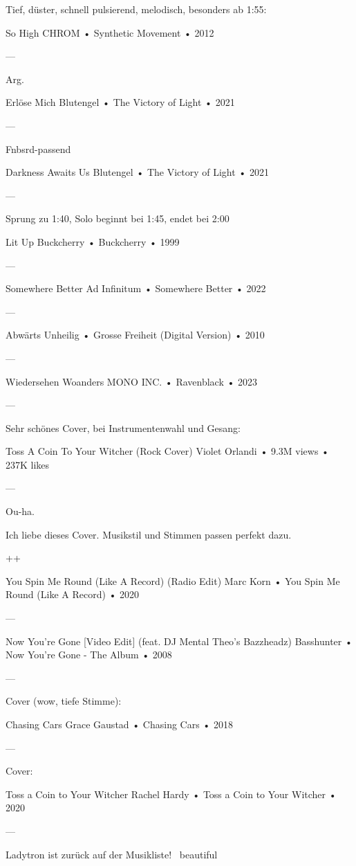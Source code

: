 Tief, düster, schnell pulsierend, melodisch, besonders ab 1:55:

So High
CHROM
 •
Synthetic Movement
 •
2012

—

Arg.

Erlöse Mich
Blutengel
 •
The Victory of Light
 •
2021


—

Fnbsrd-passend

Darkness Awaits Us
Blutengel
 •
The Victory of Light
 •
2021


—

Sprung zu 1:40, Solo beginnt bei 1:45, endet bei 2:00

Lit Up
Buckcherry
 •
Buckcherry
 •
1999



—

Somewhere Better
Ad Infinitum
 •
Somewhere Better
 •
2022


—

Abwärts
Unheilig
 •
Grosse Freiheit (Digital Version)
 •
2010

—

Wiedersehen Woanders
MONO INC.
 •
Ravenblack
 •
2023

—

Sehr schönes Cover, bei Instrumentenwahl und Gesang:

Toss A Coin To Your Witcher (Rock Cover)
Violet Orlandi
 •
9.3M views
 •
237K likes

—

Ou-ha.

Ich liebe dieses Cover. Musikstil und Stimmen passen perfekt dazu.

++

You Spin Me Round (Like A Record) (Radio Edit)
Marc Korn
 •
You Spin Me Round (Like A Record)
 •
2020

—

Now You're Gone [Video Edit] (feat. DJ Mental Theo's Bazzheadz)
Basshunter
 •
Now You're Gone - The Album
 •
2008


—

Cover (wow, tiefe Stimme):

Chasing Cars
Grace Gaustad
 •
Chasing Cars
 •
2018

—

Cover:

Toss a Coin to Your Witcher
Rachel Hardy
 •
Toss a Coin to Your Witcher
 •
2020


—

Ladytron ist zurück auf der Musikliste!
~beautiful~

